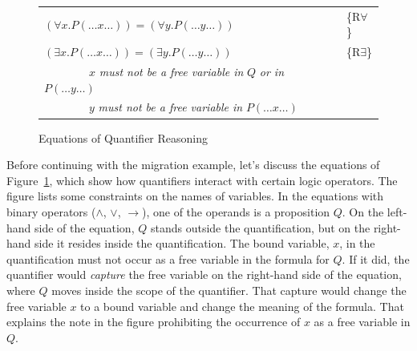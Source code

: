 {{\begin{figure}
\begin{center}
\begin{tabular}{ll}
$(\forall x.P(\dots x \dots)) = (\forall y.P(\dots y \dots))$                                     & \{R$\forall$\} \\
$(\exists x.P(\dots x \dots)) = (\exists y.P(\dots y \dots))$                                     & \{R$\exists$\} \\
~~~~~~~~$x$ \emph{must not be a free variable in} $Q$ \emph{or in} $P(\dots y \dots)$     & \\
~~~~~~~~$y$ \emph{must not be a free variable in} $P(\dots x \dots)$                      & \\
\end{tabular}
\end{center}
\caption{Equations of Quantifier Reasoning}
\label{fig-02-quantifiers}
\end{figure}

Before continuing with the migration example,
let's discuss the equations of Figure~\ref{fig-02-quantifiers},
which show how quantifiers interact with certain logic operators.
The figure lists some constraints on the names of variables.
In the equations with binary operators ($\wedge$, $\vee$, $\rightarrow$),
one of the operands
is a proposition $Q$.
On the left-hand side of the equation,
$Q$ stands outside the quantification, but
on the right-hand side it resides inside the quantification.
The bound variable, $x$, in the quantification
must not occur as a free variable in the formula for $Q$.
If it did, the quantifier would
\emph{capture}
the free variable on the right-hand side of the equation,
where $Q$ moves inside the scope of the quantifier.
That capture would change the free variable $x$ to a bound variable
and change the meaning of the formula.
That explains the note in the figure prohibiting the occurrence of $x$ as
a free variable in $Q$.

}}
